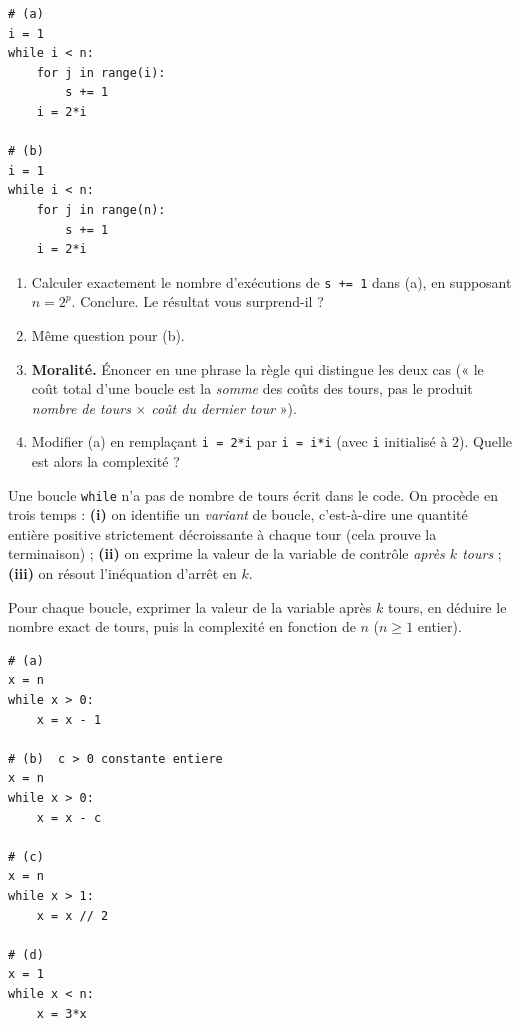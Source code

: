 \documentclass[11pt,a4paper]{article}
\begin{document}
\begin{lstlisting}
# (a)
i = 1
while i < n:
    for j in range(i):
        s += 1
    i = 2*i

# (b)
i = 1
while i < n:
    for j in range(n):
        s += 1
    i = 2*i
\end{lstlisting}

\begin{enumerate}[label=\arabic*.,leftmargin=*]
  \item Calculer exactement le nombre d'exécutions de \texttt{s += 1} dans (a),
        en supposant $n=2^p$. Conclure. Le résultat vous surprend-il ?
  \item Même question pour (b).
  \item \textbf{Moralité.} Énoncer en une phrase la règle qui distingue les deux cas
        (« le coût total d'une boucle est la \emph{somme} des coûts des tours, pas le
        produit \emph{nombre de tours} $\times$ \emph{coût du dernier tour} »).
  \item Modifier (a) en remplaçant \texttt{i = 2*i} par \texttt{i = i*i} (avec
        \texttt{i} initialisé à $2$). Quelle est alors la complexité ?
\end{enumerate}


\begin{rappel}
Une boucle \texttt{while} n'a pas de nombre de tours écrit dans le code. On procède
en trois temps :
\textbf{(i)} on identifie un \emph{variant} de boucle, c'est-à-dire une quantité
entière positive strictement décroissante à chaque tour (cela prouve la terminaison) ;
\textbf{(ii)} on exprime la valeur de la variable de contrôle \emph{après $k$ tours} ;
\textbf{(iii)} on résout l'inéquation d'arrêt en $k$.
\end{rappel}

Pour chaque boucle, exprimer la valeur de la variable après $k$ tours, en déduire le
nombre exact de tours, puis la complexité en fonction de $n$ ($n\ge1$ entier).

\begin{lstlisting}
# (a)
x = n
while x > 0:
    x = x - 1

# (b)  c > 0 constante entiere
x = n
while x > 0:
    x = x - c

# (c)
x = n
while x > 1:
    x = x // 2

# (d)
x = 1
while x < n:
    x = 3*x
\end{lstlisting}
\end{document}
